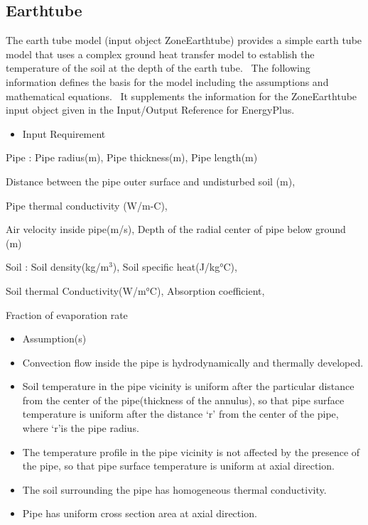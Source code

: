 \subsection{Earthtube}\label{earthtube}

The earth tube model (input object ZoneEarthtube) provides a simple earth tube model that uses a complex ground heat transfer model to establish the temperature of the soil at the depth of the earth tube.~ The following information defines the basis for the model including the assumptions and mathematical equations.~ It supplements the information for the ZoneEarthtube input object given in the Input/Output Reference for EnergyPlus.

\begin{itemize}
\tightlist
\item
  Input Requirement
\end{itemize}

Pipe : Pipe radius(m), Pipe thickness(m), Pipe length(m)

Distance between the pipe outer surface and undisturbed soil (m),

Pipe thermal conductivity (W/m-C),

Air velocity inside pipe(m/s), Depth of the radial center of pipe below ground (m)

Soil : Soil density(kg/m\(^{3}\)), Soil specific heat(J/kg°C),

Soil thermal Conductivity(W/m°C), Absorption coefficient,

Fraction of evaporation rate

\begin{itemize}
\item
  Assumption(s)
\item
  Convection flow inside the pipe is hydrodynamically and thermally developed.
\item
  Soil temperature in the pipe vicinity is uniform after the particular distance from the center of the pipe(thickness of the annulus), so that pipe surface temperature is uniform after the distance `r' from the center of the pipe, where `r'is the pipe radius.
\item
  The temperature profile in the pipe vicinity is not affected by the presence of the pipe, so that pipe surface temperature is uniform at axial direction.
\item
  The soil surrounding the pipe has homogeneous thermal conductivity.
\item
  Pipe has uniform cross section area at axial direction.
\end{itemize}

